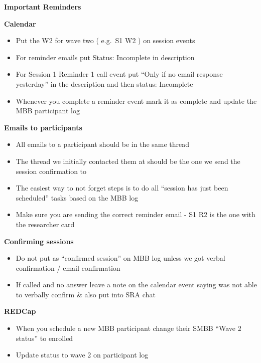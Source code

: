 \documentclass[]{book}
\providecommand{\tightlist}{%
  \setlength{\itemsep}{0pt}\setlength{\parskip}{0pt}}
\begin{document}
\textbf{Important Reminders}

\textbf{Calendar}

\begin{itemize}
\tightlist
\item
  Put the W2 for wave two ( e.g.~S1 W2 ) on session events
\item
  For reminder emails put Status: Incomplete in description
\item
  For Session 1 Reminder 1 call event put ``Only if no email response yesterday'' in the description and then status: Incomplete
\item
  Whenever you complete a reminder event mark it as complete and update the MBB participant log
\end{itemize}

\textbf{Emails to participants}

\begin{itemize}
\tightlist
\item
  All emails to a participant should be in the same thread\\
\item
  The thread we initially contacted them at should be the one we send the session confirmation to\\
\item
  The easiest way to not forget steps is to do all ``session has just been scheduled'' tasks based on the MBB log\\
\item
  Make sure you are sending the correct reminder email - S1 R2 is the one with the researcher card
\end{itemize}

\textbf{Confirming sessions}

\begin{itemize}
\tightlist
\item
  Do not put as ``confirmed session'' on MBB log unless we got verbal confirmation / email confirmation
\item
  If called and no answer leave a note on the calendar event saying was not able to verbally confirm \& also put into SRA chat
\end{itemize}

\textbf{REDCap}

\begin{itemize}
\tightlist
\item
  When you schedule a new MBB participant change their SMBB ``Wave 2 status'' to enrolled\\
\item
  Update status to wave 2 on participant log
\end{itemize}
\end{document}
